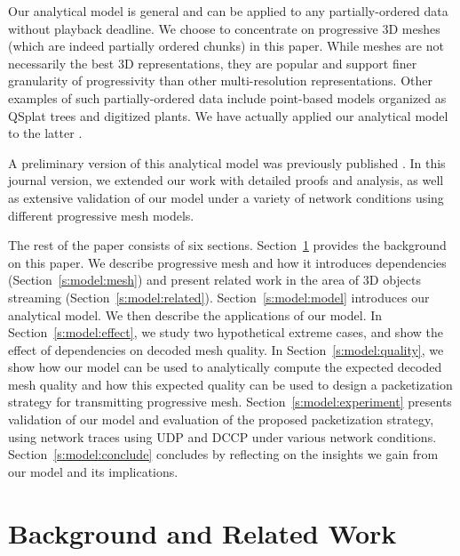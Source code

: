     Our analytical model is general and can be applied to any 
    partially-ordered data without playback deadline.  We
    choose to concentrate on progressive 3D meshes (which are indeed 
    partially ordered chunks) in this paper. 
    While meshes are not necessarily the best 3D representations, they 
    are popular and support finer granularity of progressivity 
    than other multi-resolution representations. 
    Other examples of such partially-ordered data include point-based models 
    organized as QSplat trees \cite{rusinkiewicz:qsplat} and digitized plants.  
    We have actually applied our analytical model to the latter \cite{plant:seb}.
    
    A preliminary version of this analytical model was previously published 
    \cite{cheng07analytical}.  In this journal version, we extended our work
    with detailed proofs and analysis, as well as extensive validation of our 
    model under a variety of network conditions using different progressive mesh models.

    The rest of the paper consists of six sections. Section~\ref{s:model:bg} provides the background on this paper.
    We describe progressive mesh and how it
    introduces dependencies (Section~\ref{s:model:mesh})
    and present related work in the area
    of 3D objects streaming (Section~\ref{s:model:related}).
    Section~\ref{s:model:model} introduces our analytical model.
    We then describe the applications of our model.
    In Section~\ref{s:model:effect}, we study two hypothetical extreme
    cases, and show the effect of dependencies on
    decoded mesh quality.
    In Section~\ref{s:model:quality}, we show how our
    model can be used to analytically compute the expected
    decoded mesh quality and how this expected quality
    can be used to design a packetization strategy for transmitting
    progressive mesh.  Section~\ref{s:model:experiment} presents validation
    of our model and evaluation of the proposed packetization strategy,
    using network traces using UDP and DCCP under various
    network conditions.  
    Section~\ref{s:model:conclude} concludes by
    reflecting on the insights we gain from our model and its
    implications.

\section{Background and Related Work}
\label{s:model:bg}
